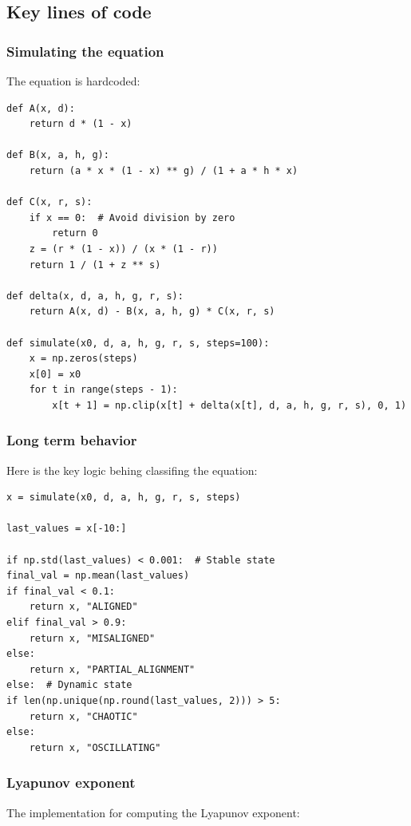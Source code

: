 \documentclass[a4paper, 10pt]{article}
\begin{document}
\subsection{Key lines of code}
\subsubsection{Simulating the equation}
The equation is hardcoded:
\begin{verbatim}
def A(x, d):
    return d * (1 - x)

def B(x, a, h, g):
    return (a * x * (1 - x) ** g) / (1 + a * h * x)

def C(x, r, s):
    if x == 0:  # Avoid division by zero
        return 0
    z = (r * (1 - x)) / (x * (1 - r))
    return 1 / (1 + z ** s)

def delta(x, d, a, h, g, r, s):
    return A(x, d) - B(x, a, h, g) * C(x, r, s)

def simulate(x0, d, a, h, g, r, s, steps=100):
    x = np.zeros(steps)
    x[0] = x0
    for t in range(steps - 1):
        x[t + 1] = np.clip(x[t] + delta(x[t], d, a, h, g, r, s), 0, 1)
\end{verbatim}
\vspace{-3em}
\subsubsection{Long term behavior}
Here is the key logic behing classifing the equation:

\begin{verbatim}
x = simulate(x0, d, a, h, g, r, s, steps)

last_values = x[-10:]

if np.std(last_values) < 0.001:  # Stable state
final_val = np.mean(last_values)
if final_val < 0.1:
    return x, "ALIGNED"
elif final_val > 0.9:
    return x, "MISALIGNED"
else:
    return x, "PARTIAL_ALIGNMENT"
else:  # Dynamic state
if len(np.unique(np.round(last_values, 2))) > 5:
    return x, "CHAOTIC"
else:
    return x, "OSCILLATING"
\end{verbatim}
\vspace{-3em}

\subsubsection{Lyapunov exponent}
The implementation for computing the Lyapunov exponent:
\end{document}
